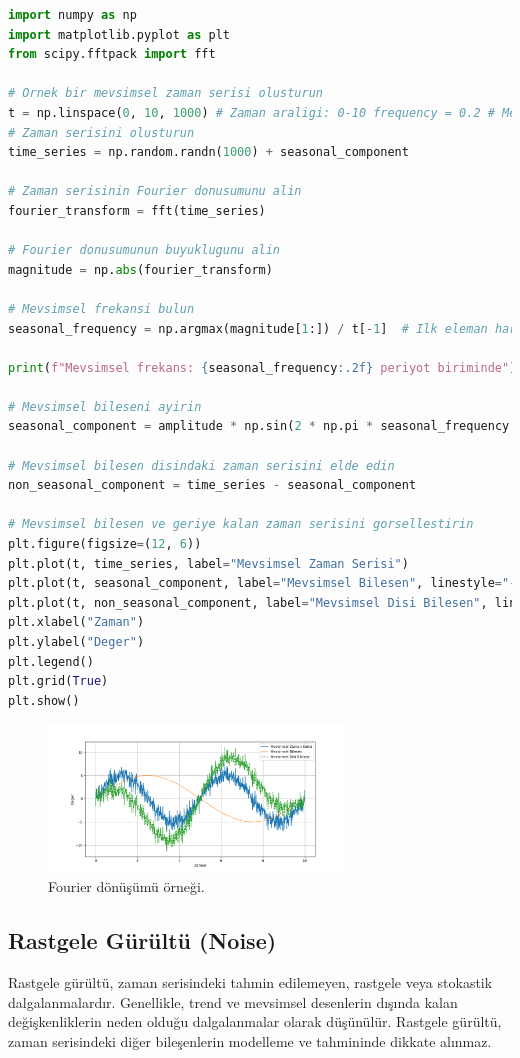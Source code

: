 \begin{lstlisting}[language=Python]
import numpy as np
import matplotlib.pyplot as plt
from scipy.fftpack import fft

# Ornek bir mevsimsel zaman serisi olusturun
t = np.linspace(0, 10, 1000) # Zaman araligi: 0-10 frequency = 0.2 # Mekanizmanin frekansi amplitude = 5 # Amplitud seasonal_component = amplitude * np.sin(2 * np.pi * frequency * t) # Mevsimsel bilesen
# Zaman serisini olusturun
time_series = np.random.randn(1000) + seasonal_component

# Zaman serisinin Fourier donusumunu alin
fourier_transform = fft(time_series)

# Fourier donusumunun buyuklugunu alin
magnitude = np.abs(fourier_transform)

# Mevsimsel frekansi bulun
seasonal_frequency = np.argmax(magnitude[1:]) / t[-1]  # Ilk eleman haric en buyuk magnitude'in indeksi

print(f"Mevsimsel frekans: {seasonal_frequency:.2f} periyot biriminde")

# Mevsimsel bileseni ayirin
seasonal_component = amplitude * np.sin(2 * np.pi * seasonal_frequency * t)

# Mevsimsel bilesen disindaki zaman serisini elde edin
non_seasonal_component = time_series - seasonal_component

# Mevsimsel bilesen ve geriye kalan zaman serisini gorsellestirin
plt.figure(figsize=(12, 6))
plt.plot(t, time_series, label="Mevsimsel Zaman Serisi")
plt.plot(t, seasonal_component, label="Mevsimsel Bilesen", linestyle="--")
plt.plot(t, non_seasonal_component, label="Mevsimsel Disi Bilesen", linestyle="--")
plt.xlabel("Zaman")
plt.ylabel("Deger")
plt.legend()
plt.grid(True)
plt.show()
\end{lstlisting}

\begin{figure}[h]
    \centering
    \includegraphics[width=0.7\textwidth]{images/fourier.png}
    \caption{Fourier dönüşümü örneği.}
    \label{fig:enter-label}
\end{figure}

\subsection{Rastgele Gürültü (Noise)}
Rastgele gürültü, zaman serisindeki tahmin edilemeyen, rastgele veya stokastik dalgalanmalardır. Genellikle, trend ve mevsimsel desenlerin dışında kalan değişkenliklerin neden olduğu dalgalanmalar olarak düşünülür. Rastgele gürültü, zaman serisindeki diğer bileşenlerin modelleme ve tahmininde dikkate alınmaz.

\newpage